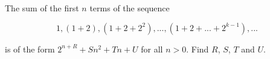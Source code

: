 The sum of the first $n$ terms of the sequence

$$ 1, (1 + 2), (1 + 2 + 2^2), ..., (1 + 2 + ... + 2^{k - 1}), ... $$

is of the form $2^{n + R} + Sn^2 + Tn + U$ for all $n > 0$. Find $R$, $S$, $T$
and $U$.
